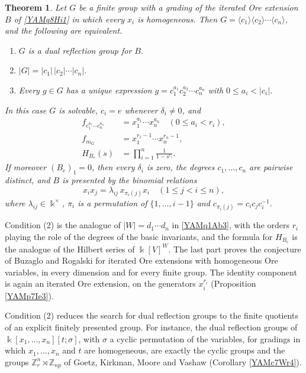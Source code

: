 \documentclass[reqno]{amsart}
\numberwithin{equation}{section}
\theoremstyle{definition}
\theoremstyle{remark}
\theoremstyle{plain}
\newtheorem{introtheorem}{Theorem}
\newcommand{\kk}{\Bbbk}
\begin{document}
\begin{introtheorem}\label{YAMtc3Mn8}
Let $G$ be a finite group with a grading of the iterated Ore extension $B$ of \eqref{YAMq8Hi1} in which every $x_i$ is homogeneous. Then $G=\langle c_1\rangle\langle c_2\rangle\cdots\langle c_n\rangle$, and the following are equivalent.
\begin{enumerate}
\item $G$ is a dual reflection group for $B$.
\item $|G|=|c_1|\,|c_2|\cdots|c_n|$.
\item Every $g\in G$ has a unique expression $g=c_1^{a_1}c_2^{a_2}\cdots c_n^{a_n}$ with $0\le a_i<|c_i|$.
\end{enumerate}
In this case $G$ is solvable, $c_i=e$ whenever $\delta_i\neq0$, and
\[
\begin{aligned}
f_{c_1^{a_1}\cdots c_n^{a_n}}&=x_1^{a_1}\cdots x_n^{a_n}\quad(0\le a_i<r_i),\\
f_{m_G}&=x_1^{r_1-1}\cdots x_n^{r_n-1},\\
H_{B_e}(s)&=\prod_{i=1}^n\frac1{1-s^{r_i}}.
\end{aligned}
\]
If moreover $(B_e)_1=0$, then every $\delta_i$ is zero, the degrees $c_1,\dots,c_n$ are pairwise distinct, and $B$ is presented by the binomial relations
\[
x_ix_j=\lambda_{ij}\,x_{\pi_i(j)}x_i\quad(1\le j<i\le n),
\]
where $\lambda_{ij}\in\kk^\times$, $\pi_i$ is a permutation of $\{1,\dots,i-1\}$ and $c_{\pi_i(j)}=c_ic_jc_i^{-1}$.
\end{introtheorem}

Condition (2) is the analogue of $|W|=d_1\cdots d_n$ in \eqref{YAMq1Ab3}, with the orders $r_i$ playing the role of the degrees of the basic invariants, and the formula for $H_{B_e}$ is the analogue of the Hilbert series of $\kk[V]^W$. The last part proves the conjecture of Buzaglo and Rogalski \cite[Conjecture 1.4]{BR} for iterated Ore extensions with homogeneous Ore variables, in every dimension and for every finite group. The identity component is again an iterated Ore extension, on the generators $x_i^{r_i}$ (Proposition \ref{YAMp7Ie3}).

Condition (2) reduces the search for dual reflection groups to the finite quotients of an explicit finitely presented group. For instance, the dual reflection groups of $\kk[x_1,\dots,x_n][t;\sigma]$, with $\sigma$ a cyclic permutation of the variables, for gradings in which $x_1,\dots,x_n$ and $t$ are homogeneous, are exactly the cyclic groups and the groups $\mathbb Z_r^n\rtimes\mathbb Z_{np}$ of Goetz, Kirkman, Moore and Vashaw (Corollary \ref{YAMc7Wr4}).
\end{document}
